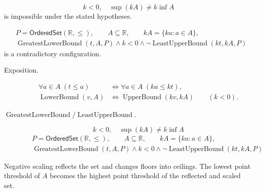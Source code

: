 \begin{remark*}
\[
k<0,\quad \sup(kA)\ne k\inf A
\]
is impossible under the stated hypotheses.
\end{remark*}

\begin{remark*}
\[
\begin{aligned}
&P=\mathsf{OrderedSet}(\mathbb{R},\leq),\qquad A\subseteq\mathbb{R},\qquad kA=\{ka:a\in A\},\\
&\operatorname{GreatestLowerBound}(t,A,P)\land k<0\land
\neg\operatorname{LeastUpperBound}(kt,kA,P)
\end{aligned}
\]
is a contradictory configuration.
\end{remark*}

\begin{remark*}
\begin{description}
  \item[Exposition.]
\[
\begin{aligned}
\forall a\in A\;(t\leq a)
&\Longleftrightarrow
\forall a\in A\;(ka\leq kt),\\
\operatorname{LowerBound}(v,A)
&\Longleftrightarrow
\operatorname{UpperBound}(kv,kA)
\qquad(k<0).
\end{aligned}
\]


  \item[\(\operatorname{GreatestLowerBound} / \operatorname{LeastUpperBound}.\)]
  \[
k<0,\quad \sup(kA)\ne k\inf A
\]
\[
\begin{aligned}
&P=\mathsf{OrderedSet}(\mathbb{R},\leq),\qquad A\subseteq\mathbb{R},\qquad kA=\{ka:a\in A\},\\
&\operatorname{GreatestLowerBound}(t,A,P)\land k<0\land
\neg\operatorname{LeastUpperBound}(kt,kA,P)
\end{aligned}
\]
\end{description}
\end{remark*}

\begin{remark*}[Interpretation]
Negative scaling reflects the set and changes floors into ceilings. The lowest point threshold of $A$ becomes the highest point threshold of the reflected and scaled set.
\end{remark*}

